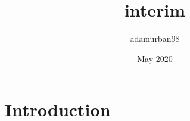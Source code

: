 \documentclass{article}
\title{interim}
\author{adamurban98 }
\date{May 2020}
\begin{document}
\maketitle

\section{Introduction}
\end{document}
